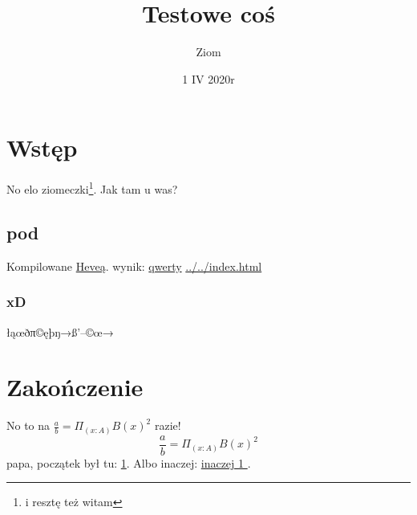 \documentclass[10pt,a4paper,utf8]{article}
\begin{document}
\title{Testowe coś}
\date{1 IV 2020r}
\author{Ziom}
\maketitle
\tableofcontents
\section{Wstęp}\label{sec:wstep}
No elo ziomeczki\footnote{i resztę też witam}.
Jak tam u was? \\
\subsection{pod}
Kompilowane  \href{http://hevea.inria.fr/}{Heveą}. wynik: \href{../../index.html}{qwerty} \url{../../index.html}
\subsubsection{xD}
łąœðπ©ęþŋ→ß’–©œ→
\section{Zakończenie}\label{sec:zakonczenie}
No to na
\( \frac{a}{b} = \Pi_{(x : A)}{B(x)}^2 \)
razie!
\[
\frac{a}{b} = \Pi_{(x : A)}{B(x)}^2
\]
papa, początek był tu: \ref{sec:wstep}. Albo inaczej: \hyperref[sec:wstep]{inaczej \ref{sec:wstep} }.
\end{document}

